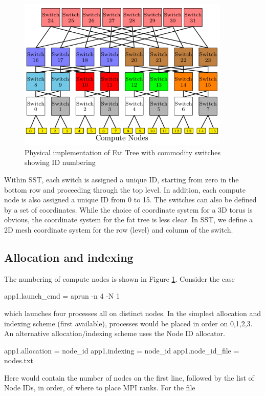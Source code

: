 \begin{figure}[h!]
\centering
\includegraphics[width=0.9\textwidth]{figures/tikz/fattree/fattree_ids.png}
\caption{Physical implementation of Fat Tree with commodity switches showing ID numbering}
\label{fig:topologies:fattreeids}
\end{figure}

Within SST, each switch is assigned a unique ID, starting from zero in the bottom row and proceeding through the top level.
In addition, each compute node is also assigned a unique ID from 0 to 15.
The switches can also be defined by a set of coordinates.
While the choice of coordinate system for a 3D torus is obvious, 
the coordinate system for the fat tree is less clear.
In SST, we define a 2D mesh coordinate system for the row (level) and column of the switch.


\subsection{Allocation and indexing}
The numbering of compute nodes is shown in Figure \ref{fig:topologies:fattreeids}.
Consider the case

\begin{ViFile}
app1.launch_cmd = aprun -n 4 -N 1
\end{ViFile}
which launches four processes all on distinct nodes.
In the simplest allocation and indexing scheme (first available),
processes would be placed in order on 0,1,2,3.
An alternative allocation/indexing scheme uses the Node ID allocator.

\begin{ViFile}
app1.allocation = node_id
app1.indexing = node_id
app1.node_id_file = nodes.txt
\end{ViFile}
Here  would contain the number of nodes on the first line, followed by the list of Node IDs, in order, of where to place MPI ranks.
For the file

